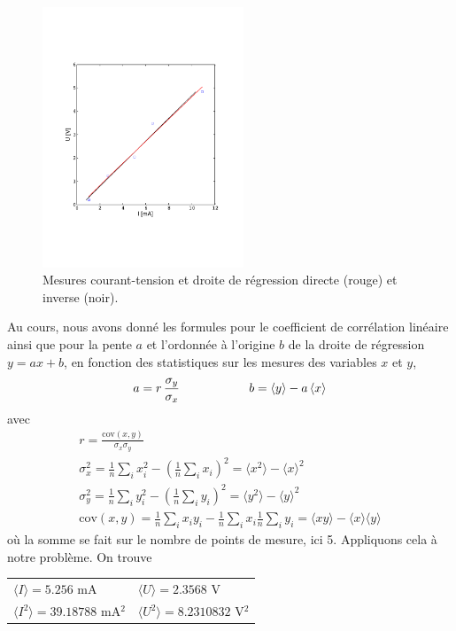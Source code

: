 \begin{figure}
   \centering
	\vspace{-5mm}
   \includegraphics[width=6cm]{assets/figures/exe5.pdf}
   \caption{Mesures courant-tension et droite de régression directe (rouge) et inverse (noir).}
   \label{fig:03}
\end{figure}
Au cours, nous avons donné les formules pour le coefficient de corrélation linéaire ainsi que pour la pente $a$ et l'ordonnée à l'origine $b$ de la droite de régression $y=ax+b$, en fonction des statistiques sur les mesures des variables $x$ et $y$,
\begin{equation*}
a=r\,\frac{\sigma_y}{\sigma_x}\hspace{2cm}b=\langle y \rangle-a\,\langle x \rangle\\
\end{equation*}
avec
\begin{gather*}
r=\frac{\text{cov}(x,y)}{\sigma_x\sigma_y}\\
\sigma_x^2=\frac{1}{n}\sum_ix_i^2-\left(\frac{1}{n}\sum_ix_i\right)^2=
\langle x^2\rangle-\langle x \rangle^2\\
\sigma_y^2=\frac{1}{n}\sum_iy_i^2-\left(\frac{1}{n}\sum_iy_i\right)^2=
\langle y^2\rangle-\langle y \rangle^2\\
\text{cov}(x,y)=\frac{1}{n}\sum_ix_iy_i-\frac{1}{n}\sum_ix_i\frac{1}{n}\sum_iy_i=
\langle xy\rangle-\langle x \rangle\langle y \rangle
\end{gather*}
où la somme se fait sur le nombre de points de mesure, ici 5. Appliquons cela à notre problème. On trouve
\begin{center}
\begin{tabular}{ll}
$\langle I \rangle=5.256$ mA & $\langle U \rangle=2.3568$ V\\
$\langle I^2 \rangle=39.18788$ mA$^2$ & $\langle U^2\rangle=8.2310832$ V$^2$
\end{tabular}
\end{center}
